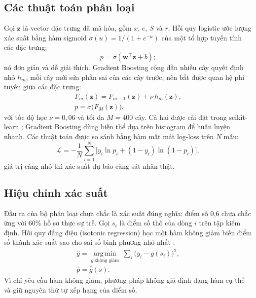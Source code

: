 \documentclass[journal]{IEEEtran}
\begin{document}
\subsection{Các thuật toán phân loại}
Gọi $\mathbf{z}$ là vector đặc trưng đã mã hóa, gồm $x$, $e$, $S$ và $r$. Hồi quy logistic ước lượng xác suất bằng hàm sigmoid $\sigma(u)=1/(1+e^{-u})$ của một tổ hợp tuyến tính các đặc trưng:
\begin{equation}
p=\sigma(\mathbf{w}^{\top}\mathbf{z}+b);
\end{equation}
nó đơn giản và dễ giải thích. Gradient Boosting \cite{friedman2001} cộng dần nhiều cây quyết định nhỏ $h_m$, mỗi cây mới sửa phần sai của các cây trước, nên bắt được quan hệ phi tuyến giữa các đặc trưng:
\begin{equation}
\begin{gathered}
F_m(\mathbf{z})=F_{m-1}(\mathbf{z})+\nu\,h_m(\mathbf{z}),\\
p=\sigma\bigl(F_M(\mathbf{z})\bigr),
\end{gathered}
\end{equation}
với tốc độ học $\nu=0{,}06$ và tối đa $M=400$ cây. Cả hai được cài đặt trong scikit-learn \cite{pedregosa2011}; Gradient Boosting dùng biến thể dựa trên histogram để huấn luyện nhanh. Các thuật toán được so sánh bằng hàm mất mát log-loss trên $N$ mẫu:
\begin{equation}
\mathcal{L}=-\frac{1}{N}\sum_{i=1}^{N}\bigl[y_i\ln p_i+(1-y_i)\ln(1-p_i)\bigr],
\end{equation}
giá trị càng nhỏ thì xác suất dự báo càng sát nhãn thật.

\subsection{Hiệu chỉnh xác suất}
Đầu ra của bộ phân loại chưa chắc là xác suất đúng nghĩa: điểm số 0,6 chưa chắc ứng với 60\% hồ sơ thực sự trễ. Gọi $s_i$ là điểm số thô của dòng $i$ trên tập kiểm định. Hồi quy đẳng điệu (isotonic regression) học một hàm không giảm biến điểm số thành xác suất sao cho sai số bình phương nhỏ nhất \cite{niculescu2005}:
\begin{equation}
\begin{gathered}
\hat{g}=\operatorname*{arg\,min}_{g\ \text{không giảm}}\ \sum_{i}\bigl(y_i-g(s_i)\bigr)^2,\\
\hat{p}=\hat{g}(s).
\end{gathered}
\end{equation}
Vì chỉ yêu cầu hàm không giảm, phương pháp không giả định dạng hàm cụ thể và giữ nguyên thứ tự xếp hạng của điểm số.
\end{document}
